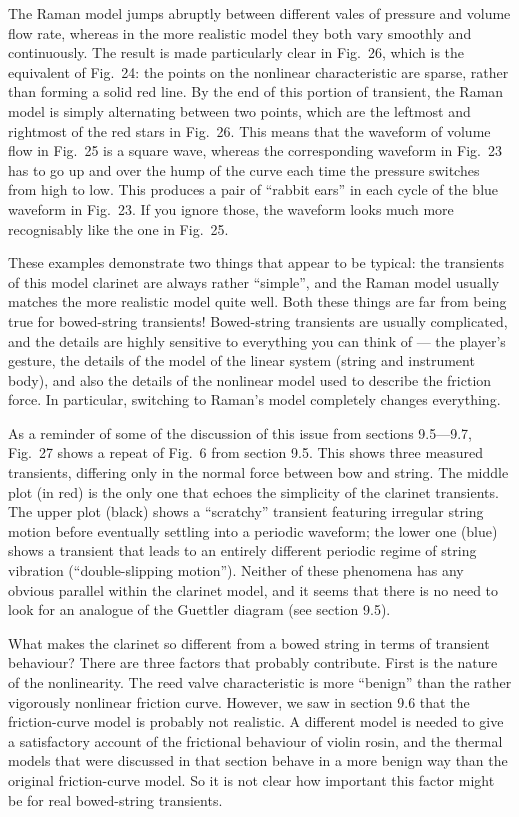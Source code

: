   The Raman model jumps abruptly between different vales of pressure and volume 
  flow rate, whereas in the more realistic model they both vary smoothly and 
  continuously. The result is made particularly clear in Fig.\ 26, which is the 
  equivalent of Fig.\ 24: the points on the nonlinear characteristic are 
  sparse, rather than forming a solid red line. By the end of this portion of 
  transient, the Raman model is simply alternating between two points, which 
  are the leftmost and rightmost of the red stars in Fig.\ 26. This means that 
  the waveform of volume flow in Fig.\ 25 is a square wave, whereas the 
  corresponding waveform in Fig.\ 23 has to go up and over the hump of the 
  curve each time the pressure switches from high to low. This produces a pair 
  of “rabbit ears” in each cycle of the blue waveform in Fig.\ 23. If you 
  ignore those, the waveform looks much more recognisably like the one in Fig.\ 
  25. 

  These examples demonstrate two things that appear to be typical: the 
  transients of this model clarinet are always rather “simple”, and the Raman 
  model usually matches the more realistic model quite well. Both these things 
  are far from being true for bowed-string transients! Bowed-string transients 
  are usually complicated, and the details are highly sensitive to everything 
  you can think of — the player’s gesture, the details of the model of the 
  linear system (string and instrument body), and also the details of the 
  nonlinear model used to describe the friction force. In particular, switching 
  to Raman's model completely changes everything. 

  As a reminder of some of the discussion of this issue from sections 9.5—9.7, 
  Fig.\ 27 shows a repeat of Fig.\ 6 from section 9.5. This shows three 
  measured transients, differing only in the normal force between bow and 
  string. The middle plot (in red) is the only one that echoes the simplicity 
  of the clarinet transients. The upper plot (black) shows a “scratchy” 
  transient featuring irregular string motion before eventually settling into a 
  periodic waveform; the lower one (blue) shows a transient that leads to an 
  entirely different periodic regime of string vibration (“double-slipping 
  motion”). Neither of these phenomena has any obvious parallel within the 
  clarinet model, and it seems that there is no need to look for an analogue of 
  the Guettler diagram (see section 9.5). 

  What makes the clarinet so different from a bowed string in terms of 
  transient behaviour? There are three factors that probably contribute. First 
  is the nature of the nonlinearity. The reed valve characteristic is more 
  ``benign'' than the rather vigorously nonlinear friction curve. However, we 
  saw in section 9.6 that the friction-curve model is probably not realistic. A 
  different model is needed to give a satisfactory account of the frictional 
  behaviour of violin rosin, and the thermal models that were discussed in that 
  section behave in a more benign way than the original friction-curve model. 
  So it is not clear how important this factor might be for real bowed-string 
  transients. 

